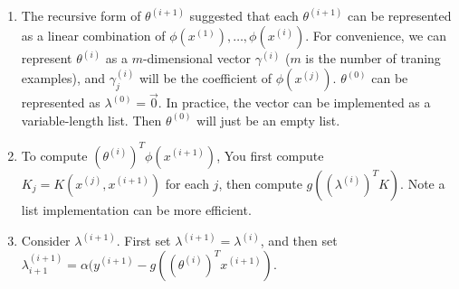 \begin{answer}
    \begin{enumerate}
        \item The recursive form of $\theta^{(i+1)}$ suggested that each $\theta^{(i+1)}$ can be represented as a linear combination of $\phi(x^{(1)}), \ldots, \phi(x^{(i)})$. For convenience, we can represent $\theta^{(i)}$ as a $m$-dimensional vector $\gamma^{(i)}$ ($m$ is the number of traning examples), and $\gamma^{(i)}_j$ will be the coefficient of $\phi(x^{(j)})$. $\theta^{(0)}$ can be represented as $\lambda^{(0)} = \vec{0}$.
            In practice, the vector can be implemented as a variable-length list. Then $\theta^{(0)}$ will just be an empty list.
        \item To compute $(\theta^{(i)})^T\phi(x^{(i+1)})$, You first compute $K_j = K(x^{(j)}, x^{(i+1)})$ for each $j$, then compute $g((\lambda^{(i)})^T K)$. Note a list implementation can be more efficient.
        \item Consider $\lambda^{(i+1)}$. First set $\lambda^{(i+1)} = \lambda^{(i)}$, and then set $\lambda^{(i+1)}_{i+1} = \alpha(y^{(i+1)} - g((\theta^{(i)})^Tx^{(i+1)})$. 

    \end{enumerate}
\end{answer}
